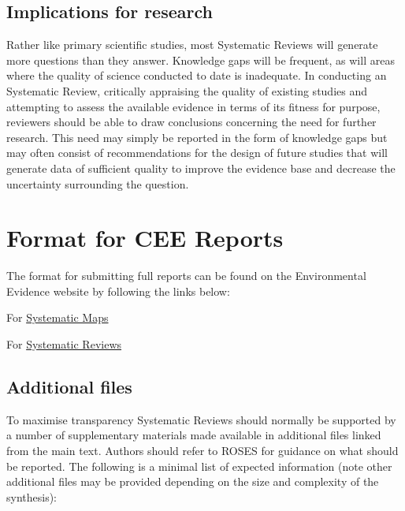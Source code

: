 \documentclass[
  letterpaper,
  DIV=11,
  numbers=noendperiod]{scrreprt}
\begin{document}
\subsection{Implications for research}\label{implications-for-research}

Rather like primary scientific studies, most Systematic Reviews will
generate more questions than they answer. Knowledge gaps will be
frequent, as will areas where the quality of science conducted to date
is inadequate. In conducting an Systematic Review, critically appraising
the quality of existing studies and attempting to assess the available
evidence in terms of its fitness for purpose, reviewers should be able
to draw conclusions concerning the need for further research. This need
may simply be reported in the form of knowledge gaps but may often
consist of recommendations for the design of future studies that will
generate data of sufficient quality to improve the evidence base and
decrease the uncertainty surrounding the question.

\section{Format for CEE Reports}\label{format-for-cee-reports}

The format for submitting full reports can be found on the Environmental
Evidence website by following the links below:

For
\href{https://environmentalevidencejournal.biomedcentral.com/submission-guidelines/preparing-your-manuscript/systematic-map}{Systematic
Maps}

For
\href{https://environmentalevidencejournal.biomedcentral.com/submission-guidelines/preparing-your-manuscript/systematic-review}{Systematic
Reviews}

\subsection{Additional files}\label{additional-files}

To maximise transparency Systematic Reviews should normally be supported
by a number of supplementary materials made available in additional
files linked from the main text. Authors should refer to ROSES for
guidance on what should be reported. The following is a minimal list of
expected information (note other additional files may be provided
depending on the size and complexity of the synthesis):
\end{document}
